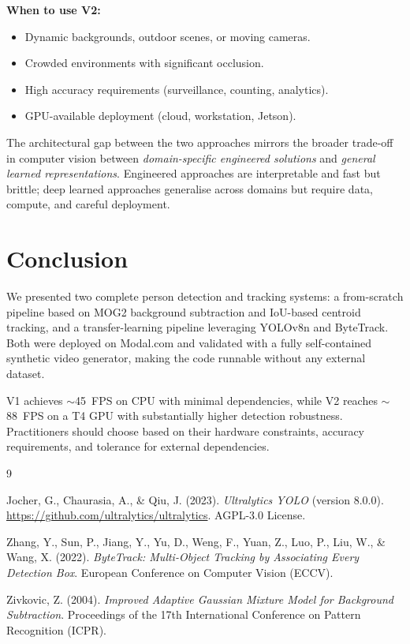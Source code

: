 \documentclass[12pt,a4paper]{article}
\begin{document}
\textbf{When to use V2:}
\begin{itemize}
    \item Dynamic backgrounds, outdoor scenes, or moving cameras.
    \item Crowded environments with significant occlusion.
    \item High accuracy requirements (surveillance, counting, analytics).
    \item GPU-available deployment (cloud, workstation, Jetson).
\end{itemize}

The architectural gap between the two approaches mirrors the broader trade-off
in computer vision between \emph{domain-specific engineered solutions} and
\emph{general learned representations}. Engineered approaches are interpretable
and fast but brittle; deep learned approaches generalise across domains but
require data, compute, and careful deployment.

\section{Conclusion}

We presented two complete person detection and tracking systems: a from-scratch
pipeline based on MOG2 background subtraction and IoU-based centroid tracking,
and a transfer-learning pipeline leveraging YOLOv8n and ByteTrack. Both were
deployed on Modal.com and validated with a fully self-contained synthetic video
generator, making the code runnable without any external dataset.

V1 achieves $\sim$45~FPS on CPU with minimal dependencies, while V2 reaches
$\sim$88~FPS on a T4 GPU with substantially higher detection robustness.
Practitioners should choose based on their hardware constraints, accuracy
requirements, and tolerance for external dependencies.

\begin{thebibliography}{9}

Jocher, G., Chaurasia, A., \& Qiu, J. (2023).
\textit{Ultralytics YOLO} (version 8.0.0).
\url{https://github.com/ultralytics/ultralytics}.
AGPL-3.0 License.

Zhang, Y., Sun, P., Jiang, Y., Yu, D., Weng, F., Yuan, Z., Luo, P.,
Liu, W., \& Wang, X. (2022).
\textit{ByteTrack: Multi-Object Tracking by Associating Every Detection Box}.
European Conference on Computer Vision (ECCV).

Zivkovic, Z. (2004).
\textit{Improved Adaptive Gaussian Mixture Model for Background Subtraction}.
Proceedings of the 17th International Conference on Pattern Recognition (ICPR).

\end{thebibliography}
\end{document}
